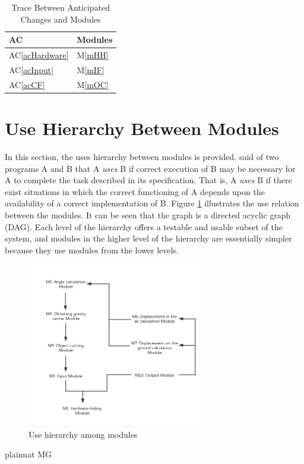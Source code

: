 \documentclass[12pt, titlepage]{article}
\newcommand{\acref}[1]{AC\ref{#1}}
\newcommand{\mref}[1]{M\ref{#1}}
\begin{document}
	\begin{table}[H]
		\centering
		\begin{tabular}{p{} p{}}
			\toprule
			\textbf{AC} & \textbf{Modules}\\
			\midrule
			\acref{acHardware} & \mref{mHH}\\
			\acref{acInput} & \mref{mIF}\\
			\acref{acCF} & \mref{mOC}\\
			\bottomrule
		\end{tabular}
		\caption{Trace Between Anticipated Changes and Modules}
		\label{TblACT}
	\end{table}
	
	\section{Use Hierarchy Between Modules} \label{SecUse}
	
	In this section, the uses hierarchy between modules is
	provided. \citet{Parnas1978} said of two programs A and B that A {\em uses} B if
	correct execution of B may be necessary for A to complete the task described in
	its specification. That is, A {\em uses} B if there exist situations in which
	the correct functioning of A depends upon the availability of a correct
	implementation of B.  Figure \ref{FigUH} illustrates the use relation between
	the modules. It can be seen that the graph is a directed acyclic graph
	(DAG). Each level of the hierarchy offers a testable and usable subset of the
	system, and modules in the higher level of the hierarchy are essentially simpler
	because they use modules from the lower levels.
	
	\begin{figure}[H]
		\centering
		\includegraphics[width=0.7\textwidth]{./Figure1.png}
		\caption{Use hierarchy among modules}
		\label{FigUH}
	\end{figure}
	
	
	 {plainnat}
	 {MG}
	
\end{document}
